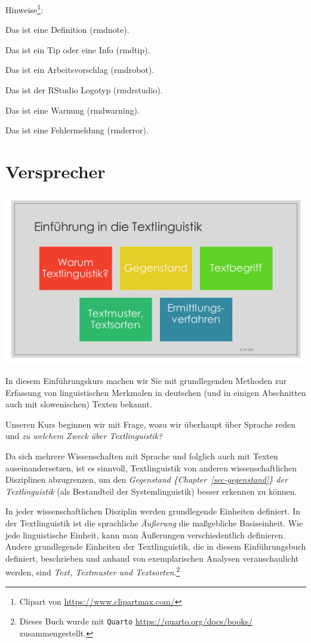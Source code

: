 \documentclass[
  letterpaper,
]{scrbook}
\begin{document}
Hinweise\footnote{Clipart von \url{https://www.clipartmax.com/}}:

Das ist eine Definition (rmdnote).

Das ist ein Tip oder eine Info (rmdtip).

Das ist ein Arbeitsvorschlag (rmdrobot).

Das ist der RStudio Logotyp (rmdrstudio).

Das ist eine Warnung (rmdwarning).

Das ist eine Fehlermeldung (rmderror).

\hypertarget{sec-versprecher}{%
\chapter{Versprecher}\label{sec-versprecher}}

\includegraphics[width=1\textwidth,height=\textheight]{./pictures/Diapozitiv5.PNG}

In diesem Einführungskurs machen wir Sie mit grundlegenden Methoden zur
Erfassung von linguistischen Merkmalen in deutschen (und in einigen
Abschnitten auch mit slowenischen) Texten bekannt.

Unseren Kurs beginnen wir mit Frage, wozu wir überhaupt über Sprache
reden und \emph{zu welchem Zweck über Textlinguistik?}

Da sich mehrere Wissenschaften mit Sprache und folglich auch mit Texten
auseinandersetzen, ist es sinnvoll, Textlinguistik von anderen
wissenschaftlichen Disziplinen abzugrenzen, um den \emph{Gegenstand
\{Chapter~\ref{sec-gegenstand}\} der Textlinguistik} (als Bestandteil
der Systemlinguistik) besser erkennen zu können.

In jeder wissenschaftlichen Disziplin werden grundlegende Einheiten
definiert. In der Textlinguistik ist die sprachliche \emph{Äußerung} die
maßgebliche Basiseinheit. Wie jede linguistische Einheit, kann man
Äußerungen verschiedentlich definieren. Andere grundlegende Einheiten
der Textlinguistik, die in diesem Einführungsbuch definiert, beschrieben
und anhand von exemplarischen Analysen veranschaulicht werden, sind
\emph{Text, Textmuster und Textsorten}.\footnote{Dieses Buch wurde mit
  \texttt{Quarto} \url{https://quarto.org/docs/books/} zusammengestellt.}
\end{document}
